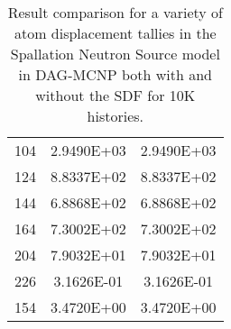\begin{table}[H]
\begin{center}
\begin{tabular}{lcc}
      104          & 2.9490E+03 & 2.9490E+03        \\
      124          & 8.8337E+02 & 8.8337E+02        \\
      144          & 6.8868E+02 & 6.8868E+02        \\
      164          & 7.3002E+02 & 7.3002E+02        \\
      204          & 7.9032E+01 & 7.9032E+01        \\
      226          & 3.1626E-01 & 3.1626E-01        \\
      154          & 3.4720E+00 & 3.4720E+00        \\
      \bottomrule
    \end{tabular}
    \caption[Results of tally values in SNS for various DAG-MNP
      implementations.]{Result comparison for a variety of atom displacement
      tallies in the Spallation Neutron Source model in DAG-MCNP both with and
      without the SDF for 10K histories.}
  \end{center}
\end{table}
